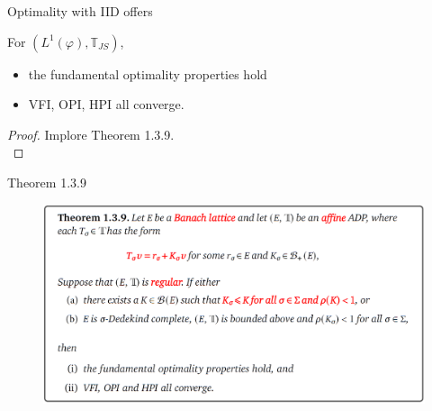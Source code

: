 \documentclass[aspectratio=169]{beamer} %
\begin{document}
\begin{frame}{Optimality with IID offers}
    \begin{theorem}
        For $(L^1(\varphi),\mathbb{T}_{JS})$,
        \begin{itemize}
            \item the fundamental optimality properties hold
            \item VFI, OPI, HPI all converge.
        \end{itemize}
    \end{theorem}

    \begin{proof}
    Implore Theorem 1.3.9.\\
\end{proof}

\end{frame}


\begin{frame}{Theorem 1.3.9}

    \begin{figure}
        \centering
        \includegraphics[width=0.85\linewidth]{Dynamic Programming//DP2//Chapter 4//Section 4.1.1. Job Search/thm1.3.9.png}
    \end{figure}


\end{frame}
\end{document}
